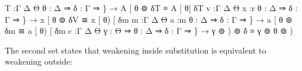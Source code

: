 \documentclass{acm_proc_article-sp}
\begin{document}
\begin{code}%
\>\AgdaFunction{
[⊚]}T    :\AgdaBound{\{}Γ Δ Θ \AgdaBound{\{}θ : Δ ⇒ \AgdaBound{\{}δ : Γ ⇒ \} 
        → A [ θ ⊚ δ\AgdaFunction{ ]}T ≡ \AgdaBound{(}A [ θ\AgdaFunction{ ]}\AgdaFunction{)}[ δ\AgdaFunction{ ]}T  
\AgdaFunction{
[⊚]}v    :\AgdaBound{\{}Γ Δ Θ \AgdaBound{(}x :r \AgdaBound{\{}θ : Δ ⇒ \AgdaBound{\{}δ : Γ ⇒ \}
        → x [ θ ⊚ δ\AgdaFunction{ ]}V ≅ \AgdaBound{(}x [ θ\AgdaFunction{ ]}) [ δ\AgdaFunction{ ]t}m
m   :\AgdaBound{\{}Γ Δ Θ \AgdaBound{(}a :m \AgdaBound{\{}θ : Δ ⇒ \AgdaBound{\{}δ : Γ ⇒ \}
        → a [ θ ⊚ δ\AgdaFunction{ ]t}m ≅ \AgdaBound{(}a [ θ\AgdaFunction{ ]t}) [ δ\AgdaFunction{ ]t}m
c  :\AgdaBound{\{}Γ Δ Θ \AgdaBound{(}γ : Θ ⇒ \AgdaBound{\{}θ : Δ ⇒ \AgdaBound{\{}δ : Γ ⇒ \}  
        → \AgdaBound{(}γ ⊚ ) ⊚ δ ≡ γ ⊚ \AgdaBound{(}θ ⊚ )  
\<%
\end{code}




The second set states that weakening inside substitution is equivalent to weakening outside:
\end{document}
